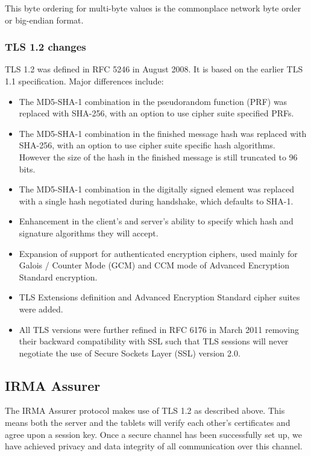 This byte ordering for multi-byte values is the commonplace network byte order or big-endian format.~\cite{tls1.2}

\subsubsection{TLS 1.2 changes}
TLS 1.2 was defined in RFC 5246 in August 2008. It is based on the earlier TLS 1.1 specification. Major differences include:

\begin{itemize}
	\item The MD5-SHA-1 combination in the pseudorandom function (PRF) was replaced with SHA-256, with an option to use cipher suite specified PRFs.
  \item The MD5-SHA-1 combination in the finished message hash was replaced with SHA-256, with an option to use cipher suite specific hash algorithms. However the size of the hash in the finished message is still truncated to 96 bits.
  \item The MD5-SHA-1 combination in the digitally signed element was replaced with a single hash negotiated during handshake, which defaults to SHA-1.
  \item Enhancement in the client's and server's ability to specify which hash and signature algorithms they will accept.
  \item Expansion of support for authenticated encryption ciphers, used mainly for Galois / Counter Mode (GCM) and CCM mode of Advanced Encryption Standard encryption.
  \item TLS Extensions definition and Advanced Encryption Standard cipher suites were added.
  \item All TLS versions were further refined in RFC 6176 in March 2011 removing their backward compatibility with SSL such that TLS sessions will never negotiate the use of Secure Sockets Layer (SSL) version 2.0.
\end{itemize}

\subsection{IRMA Assurer}
The IRMA Assurer protocol makes use of TLS 1.2 as described above. This means both the server and the tablets will verify each other's certificates and agree upon a session key. Once a secure channel has been successfully set up, we have achieved privacy and data integrity of all communication over this channel.~\cite{tls1.2} 

